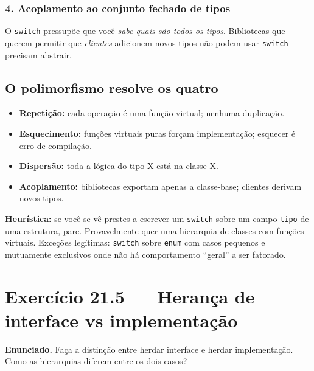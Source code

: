 \documentclass[11pt,a4paper]{article}
\begin{document}
\subsubsection*{4. Acoplamento ao conjunto fechado de tipos}

O \texttt{switch} pressup\~oe que voc\^e \emph{sabe quais s\~ao todos os tipos}. Bibliotecas que querem permitir que \emph{clientes} adicionem novos tipos n\~ao podem usar \texttt{switch} --- precisam abstrair.

\subsection*{O polimorfismo resolve os quatro}

\begin{itemize}[leftmargin=*,itemsep=0pt]
  \item \textbf{Repeti\c{c}\~ao:} cada opera\c{c}\~ao \'e uma fun\c{c}\~ao virtual; nenhuma duplica\c{c}\~ao.
  \item \textbf{Esquecimento:} fun\c{c}\~oes virtuais puras for\c{c}am implementa\c{c}\~ao; esquecer \'e erro de compila\c{c}\~ao.
  \item \textbf{Dispers\~ao:} toda a l\'ogica do tipo X est\'a na classe X.
  \item \textbf{Acoplamento:} bibliotecas exportam apenas a classe-base; clientes derivam novos tipos.
\end{itemize}

\begin{boaprat}
\textbf{Heur\'istica:} se voc\^e se v\^e prestes a escrever um \texttt{switch} sobre um campo \texttt{tipo} de uma estrutura, pare. Provavelmente quer uma hierarquia de classes com fun\c{c}\~oes virtuais. Exce\c{c}\~oes leg\'itimas: \texttt{switch} sobre \texttt{enum} com casos pequenos e mutuamente exclusivos onde n\~ao h\'a comportamento ``geral'' a ser fatorado.
\end{boaprat}

\newpage
\section{Exerc\'icio 21.5 --- Heran\c{c}a de interface vs implementa\c{c}\~ao}

\begin{enunciado}
\textbf{Enunciado.} Fa\c{c}a a distin\c{c}\~ao entre herdar interface e herdar implementa\c{c}\~ao. Como as hierarquias diferem entre os dois casos?
\end{enunciado}
\end{document}
